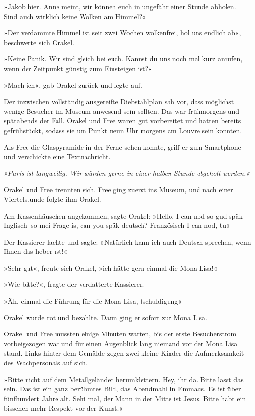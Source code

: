 »Jakob hier. Anne meint, wir können euch in ungefähr einer Stunde abholen. Sind auch wirklich keine Wolken am Himmel?«

»Der verdammte Himmel ist seit zwei Wochen wolkenfrei, hol uns endlich ab«, beschwerte sich Orakel.

»Keine Panik. Wir sind gleich bei euch. Kannst du uns noch mal kurz anrufen, wenn der Zeitpunkt günstig zum Einsteigen ist?«

»Mach ich«, gab Orakel zurück und legte auf.

Der inzwischen vollständig ausgereifte Diebstahlplan sah vor, dass möglichst wenige Besucher im Museum anwesend sein sollten. Das war frühmorgens und spätabends der Fall. Orakel und Free waren gut vorbereitet und hatten bereits gefrühstückt, sodass sie um Punkt neun Uhr morgens am Louvre sein konnten.

Als Free die Glaspyramide in der Ferne sehen konnte, griff er zum Smartphone und verschickte eine Textnachricht.

\textit{»Paris ist langweilig. Wir würden gerne in einer halben Stunde abgeholt werden.«}

Orakel und Free trennten sich. Free ging zuerst ins Museum, und nach einer Viertelstunde folgte ihm Orakel.

Am Kassenhäuschen angekommen, sagte Orakel: »Hello. I can nod so gud späk Inglisch, so mei Frage is, can you späk deutsch? Französisch I can nod, tu«

Der Kassierer lachte und sagte: »Natürlich kann ich auch Deutsch sprechen, wenn Ihnen das lieber ist!«

»Sehr gut«, freute sich Orakel, »ich hätte gern einmal die Mona Lisa!«

»Wie bitte?«, fragte der verdatterte Kassierer.

»Äh, einmal die Führung für die Mona Lisa, tschuldigung«

Orakel wurde rot und bezahlte. Dann ging er sofort zur Mona Lisa.

Orakel und Free mussten einige Minuten warten, bis der erste Besucherstrom vorbeigezogen war und für einen Augenblick lang niemand vor der Mona Lisa stand. Links hinter dem Gemälde zogen zwei kleine Kinder die Aufmerksamkeit des Wachpersonals auf sich.

»Bitte nicht auf dem Metallgeländer herumklettern. Hey, ihr da. Bitte lasst das sein. Das ist ein ganz berühmtes Bild, das Abendmahl in Emmaus. Es ist über fünfhundert Jahre alt. Seht mal, der Mann in der Mitte ist Jesus. Bitte habt ein bisschen mehr Respekt vor der Kunst.«

